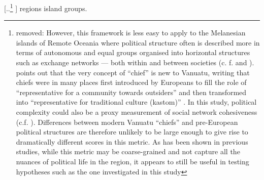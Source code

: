\documentclass[unnumsec,webpdf,modern,medium]{oup-authoring-template}
\providecommand{\DIFaddtex}[1]{{\protect\color{blue} \sf #1}} %
\providecommand{\DIFdeltex}[1]{{\protect\color{red} [..\footnote{removed: #1} ]}} %
\providecommand{\DIFaddbegin}{} %
\providecommand{\DIFaddend}{} %
\providecommand{\DIFdelbegin}{} %
\providecommand{\DIFdelend}{} %
\providecommand{\DIFadd}[1]{\texorpdfstring{\DIFaddtex{#1}}{#1}} %
\providecommand{\DIFdel}[1]{\texorpdfstring{\DIFdeltex{#1}}{}} %
\newcommand{\DIFscaledelfig}{0.5}
\newlength{\DIFdelgraphicswidth} %
\newlength{\DIFdelgraphicsheight} %
\newcommand{\DIFaddincludegraphics}[2][]{{\color{blue}\fbox{\DIFOincludegraphics[#1]{#2}}}} %
\newcommand{\DIFdelincludegraphics}[2][]{%
\sbox{\DIFdelgraphicsbox}{\DIFOincludegraphics[#1]{#2}}%
\settoboxwidth{\DIFdelgraphicswidth}{\DIFdelgraphicsbox} %
\settoboxtotalheight{\DIFdelgraphicsheight}{\DIFdelgraphicsbox} %
\scalebox{\DIFscaledelfig}{%
\parbox[b]{\DIFdelgraphicswidth}{\usebox{\DIFdelgraphicsbox}\\[-\baselineskip] \rule{\DIFdelgraphicswidth}{0em}}\llap{\resizebox{\DIFdelgraphicswidth}{\DIFdelgraphicsheight}{%
\setlength{\unitlength}{\DIFdelgraphicswidth}%
\begin{picture}(1,1)%
\thicklines\linethickness{2pt} %
{\color[rgb]{1,0,0}\put(0,0){\framebox(1,1){}}}%
{\color[rgb]{1,0,0}\put(0,0){\line( 1,1){1}}}%
{\color[rgb]{1,0,0}\put(0,1){\line(1,-1){1}}}%
\end{picture}%
}\hspace*{3pt}}} %
} %
\DeclareRobustCommand{\DIFaddbegin}{\DIFOaddbegin \let\includegraphics\DIFaddincludegraphics} %
\DeclareRobustCommand{\DIFaddend}{\DIFOaddend \let\includegraphics\DIFOincludegraphics} %
\DeclareRobustCommand{\DIFdelbegin}{\DIFOdelbegin \let\includegraphics\DIFdelincludegraphics} %
\DeclareRobustCommand{\DIFdelend}{\DIFOaddend \let\includegraphics\DIFOincludegraphics} %
\begin{document}
\DIFdel{However, this framework is less easy to apply to the Melanesian islands of Remote Oceania where political structure often is described more in terms of autonomous and equal groups organised into horizontal structures such as exchange networks --- both within and between societies (c. f. \citet{bonnemaison1996graded} and \citet{huffman1996trading}). \citet{bolton1998chief} points out that the very concept of ``chief'' is new to Vanuatu, writing that chiefs were in many places first introduced by Europeans to fill the role of ``representative for a community towards outsiders'' and then transformed into ``representative for traditional culture (kastom)'' \citep[185]{bolton1998chief}. In this study, political complexity could also be a proxy measurement of social network cohesiveness (c.f. \citet{grace_1992_aberrant}). Differences between modern Vanuatu ``chiefs'' and pre-European political structures are therefore unlikely to be large enough to give rise to dramatically different scores in this metric. As has been shown in previous studies, while this metric may be coarse-grained and not capture all the nuances of political life in the region, it appears to still be useful in testing hypotheses such as the one investigated in this study}\DIFdelend \DIFaddbegin \DIFadd{regions island groups}\DIFaddend .

\DIFdelbegin %


\end{document}
